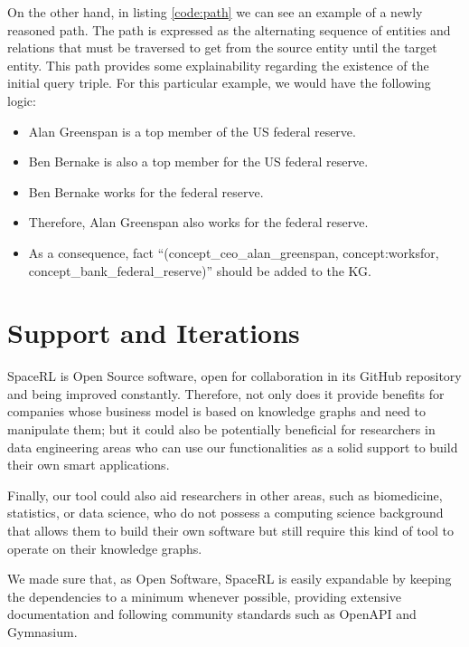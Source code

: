 On the other hand, in listing \ref{code:path} we can see an example of a newly reasoned path. The path is expressed as the alternating sequence of entities and relations that must be traversed to get from the source entity until the target entity. This path provides some explainability regarding the existence of the initial query triple. For this particular example, we would have the following logic:

\begin{itemize}
    \item Alan Greenspan is a top member of the US federal reserve.
    \item Ben Bernake is also a top member for the US federal reserve.
    \item Ben Bernake works for the federal reserve.
    \item Therefore, Alan Greenspan also works for the federal reserve.
    \item As a consequence, fact ``(concept\_ceo\_alan\_greenspan, concept:worksfor,\\  concept\_bank\_federal\_reserve)'' should be added to the KG.
\end{itemize}

\section{Support and Iterations}\label{sec:framework-future}

SpaceRL is Open Source software, open for collaboration in its GitHub repository\cite{SpaceRL} and being improved constantly. Therefore, not only does it provide benefits for companies whose business model is based on knowledge graphs and need to manipulate them; but it could also be potentially beneficial for researchers in data engineering areas who can use our functionalities as a solid support to build their own smart applications.

Finally, our tool could also aid researchers in other areas, such as biomedicine, statistics, or data science, who do not possess a computing science background that allows them to build their own software but still require this kind of tool to operate on their knowledge graphs.


We made sure that, as Open Software, SpaceRL is easily expandable by keeping the dependencies to a minimum whenever possible, providing extensive documentation and following community standards such as OpenAPI and Gymnasium.

